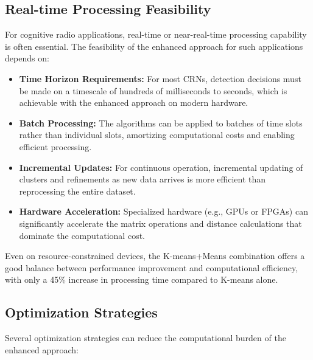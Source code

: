 \subsection{Real-time Processing Feasibility}

For cognitive radio applications, real-time or near-real-time processing capability is often essential. The feasibility of the enhanced approach for such applications depends on:

\begin{itemize}
    \item \textbf{Time Horizon Requirements:} For most CRNs, detection decisions must be made on a timescale of hundreds of milliseconds to seconds, which is achievable with the enhanced approach on modern hardware.
    
    \item \textbf{Batch Processing:} The algorithms can be applied to batches of time slots rather than individual slots, amortizing computational costs and enabling efficient processing.
    
    \item \textbf{Incremental Updates:} For continuous operation, incremental updating of clusters and refinements as new data arrives is more efficient than reprocessing the entire dataset.
    
    \item \textbf{Hardware Acceleration:} Specialized hardware (e.g., GPUs or FPGAs) can significantly accelerate the matrix operations and distance calculations that dominate the computational cost.
\end{itemize}

Even on resource-constrained devices, the K-means+Means combination offers a good balance between performance improvement and computational efficiency, with only a 45\% increase in processing time compared to K-means alone.

\subsection{Optimization Strategies}

Several optimization strategies can reduce the computational burden of the enhanced approach:

